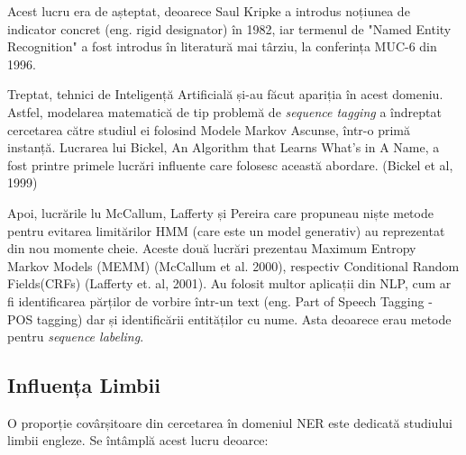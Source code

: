 Acest lucru era de așteptat, deoarece Saul Kripke a introdus noțiunea de indicator concret (eng. rigid designator) în 1982, iar termenul de "Named Entity Recognition" a fost introdus în literatură mai târziu, la conferința MUC-6 din 1996.\cite{grishman1996}


Treptat, tehnici de Inteligență Artificială și-au făcut apariția în acest domeniu. Astfel, modelarea matematică de tip problemă de \textit{sequence tagging} a îndreptat cercetarea către studiul ei folosind Modele Markov Ascunse, într-o primă instanță. Lucrarea lui Bickel, An Algorithm that Learns What's in A Name, a fost printre primele lucrări influente care folosesc această abordare. (Bickel et al, 1999)\cite{Bikel99analgorithm}

Apoi, lucrările lu McCallum, Lafferty și Pereira care propuneau niște metode pentru evitarea limitărilor HMM (care este un model generativ) au reprezentat din nou momente cheie. Aceste două lucrări prezentau Maximum Entropy Markov Models (MEMM) (McCallum et al. 2000)\cite{Mccallum00maximumentropy}, respectiv Conditional Random Fields(CRFs) (Lafferty et. al, 2001)\cite{Lafferty01conditionalrandom}. Au folosit multor aplicații din NLP, cum ar fi identificarea părților de vorbire într-un text (eng. Part of Speech Tagging - POS tagging) dar și identificării entităților cu nume. Asta deoarece erau metode pentru \textit{sequence labeling}.


\subsection{Influența Limbii}

O proporție covârșitoare din cercetarea în domeniul NER este dedicată studiului limbii engleze. Se întâmplă acest lucru deoarce:

